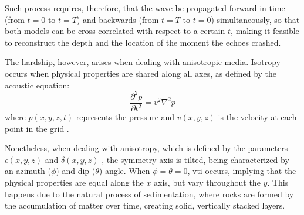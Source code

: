\documentclass[cic,tc,english]{infufrgs}
\begin{document}
Such process requires, therefore, that the wave be propagated forward in time
(from $t = 0$ to $t = T$) and backwards (from $t = T$ to $t = 0$)
simultaneously,
so that both models can be cross-correlated with respect to a certain
$t$, making
it feasible to reconstruct the depth and the location of the moment the echoes
crashed.

The hardship, however, arises when dealing with anisotropic media.
Isotropy occurs when
physical properties are shared along all axes, as defined by the
acoustic equation:
\begin{equation}
  \frac{\partial^2 p}{\partial t^2} = v^2 \nabla^2 p
\end{equation}
where $p(x, y, z, t)$ represents the pressure and $v(x, y, z)$ is the
velocity at each point in the grid \cite{fletcher_modeling}.

Nonetheless, when dealing with anisotropy, which is defined by the parameters
$\epsilon(x, y, z)$ and $\delta(x, y, z)$ \cite{anisotropy}, the
symmetry axis is tilted, being characterized by an azimuth ($\phi$)
and dip ($\theta$) angle. When $\phi = \theta = 0$, \acrfull{vti}
occurs, implying that the physical properties are equal along the $x$
axis, but vary throughout the $y$. This happens due to the natural
process of sedimentation, where rocks are formed by the accumulation
of matter over time, creating solid, vertically stacked layers.
\end{document}
